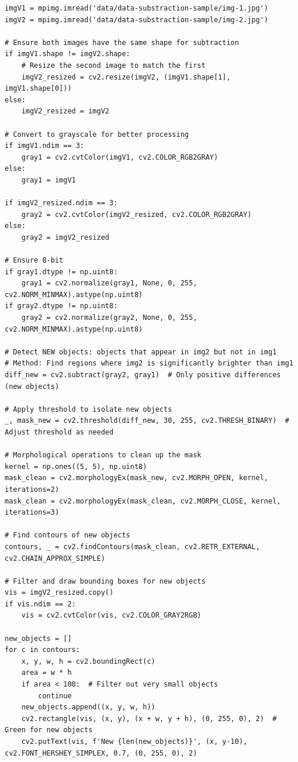 \documentclass[12pt,letterpaper]{article}
\begin{document}
\begin{verbatim}
imgV1 = mpimg.imread('data/data-substraction-sample/img-1.jpg')
imgV2 = mpimg.imread('data/data-substraction-sample/img-2.jpg')

# Ensure both images have the same shape for subtraction
if imgV1.shape != imgV2.shape:
    # Resize the second image to match the first
    imgV2_resized = cv2.resize(imgV2, (imgV1.shape[1], imgV1.shape[0]))
else:
    imgV2_resized = imgV2

# Convert to grayscale for better processing
if imgV1.ndim == 3:
    gray1 = cv2.cvtColor(imgV1, cv2.COLOR_RGB2GRAY)
else:
    gray1 = imgV1

if imgV2_resized.ndim == 3:
    gray2 = cv2.cvtColor(imgV2_resized, cv2.COLOR_RGB2GRAY)
else:
    gray2 = imgV2_resized

# Ensure 8-bit
if gray1.dtype != np.uint8:
    gray1 = cv2.normalize(gray1, None, 0, 255, cv2.NORM_MINMAX).astype(np.uint8)
if gray2.dtype != np.uint8:
    gray2 = cv2.normalize(gray2, None, 0, 255, cv2.NORM_MINMAX).astype(np.uint8)

# Detect NEW objects: objects that appear in img2 but not in img1
# Method: Find regions where img2 is significantly brighter than img1
diff_new = cv2.subtract(gray2, gray1)  # Only positive differences (new objects)

# Apply threshold to isolate new objects
_, mask_new = cv2.threshold(diff_new, 30, 255, cv2.THRESH_BINARY)  # Adjust threshold as needed

# Morphological operations to clean up the mask
kernel = np.ones((5, 5), np.uint8)
mask_clean = cv2.morphologyEx(mask_new, cv2.MORPH_OPEN, kernel, iterations=2)
mask_clean = cv2.morphologyEx(mask_clean, cv2.MORPH_CLOSE, kernel, iterations=3)

# Find contours of new objects
contours, _ = cv2.findContours(mask_clean, cv2.RETR_EXTERNAL, cv2.CHAIN_APPROX_SIMPLE)

# Filter and draw bounding boxes for new objects
vis = imgV2_resized.copy()
if vis.ndim == 2:
    vis = cv2.cvtColor(vis, cv2.COLOR_GRAY2RGB)

new_objects = []
for c in contours:
    x, y, w, h = cv2.boundingRect(c)
    area = w * h
    if area < 100:  # Filter out very small objects
        continue
    new_objects.append((x, y, w, h))
    cv2.rectangle(vis, (x, y), (x + w, y + h), (0, 255, 0), 2)  # Green for new objects
    cv2.putText(vis, f'New {len(new_objects)}', (x, y-10), cv2.FONT_HERSHEY_SIMPLEX, 0.7, (0, 255, 0), 2)


\end{verbatim}
\end{document}
